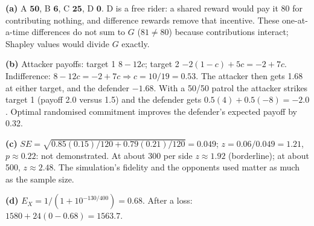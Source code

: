 \documentclass[11pt]{article}
\begin{document}
\begin{soln}\textbf{(a)} A $\mathbf{50}$, B $\mathbf{6}$, C $\mathbf{25}$, D $\mathbf{0}$. D is a free rider: a shared reward would pay it 80 for contributing nothing, and difference rewards remove that incentive. These one-at-a-time differences do not sum to $G$ ($81\ne80$) because contributions interact; Shapley values would divide $G$ exactly.

\textbf{(b)} Attacker payoffs: target 1 $8-12c$; target 2 $-2(1-c)+5c=-2+7c$. Indifference: $8-12c=-2+7c\Rightarrow c=10/19=\mathbf{0.53}$. The attacker then gets 1.68 at either target, and the defender $-1.68$. With a 50/50 patrol the attacker strikes target 1 (payoff 2.0 versus 1.5) and the defender gets $0.5(4)+0.5(-8)=\mathbf{-2.0}$. Optimal randomised commitment improves the defender's expected payoff by 0.32.

\textbf{(c)} $SE=\sqrt{0.85(0.15)/120+0.79(0.21)/120}=0.049$; $z=0.06/0.049=1.21$, $p\approx0.22$: not demonstrated. At about 300 per side $z\approx1.92$ (borderline); at about 500, $z\approx2.48$. The simulation's fidelity and the opponents used matter as much as the sample size.

\textbf{(d)} $E_X=1/(1+10^{-130/400})=\mathbf{0.68}$. After a loss: $1580+24(0-0.68)=\mathbf{1563.7}$.\end{soln}
\end{document}
